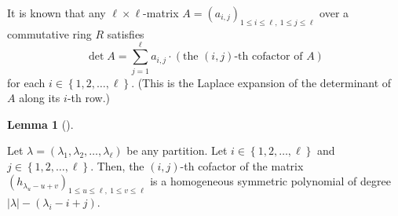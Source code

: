 \documentclass[numbers=enddot,12pt,final,onecolumn,notitlepage]{scrartcl}%
\theoremstyle{definition}
\newtheorem{lem}[theo]{Lemma}
\newenvironment{lemma}[1][]
{\begin{lem}[#1]\begin{leftbar}}
{\end{leftbar}\end{lem}}
\let\sumnonlimits\sum
\renewcommand{\sum}{\sumnonlimits\limits}
\begin{document}
It is known that any $\ell\times\ell$-matrix $A=\left(  a_{i,j}\right)
_{1\leq i\leq\ell,\ 1\leq j\leq\ell}$ over a commutative ring $R$ satisfies%
\begin{equation}
\det A=\sum_{j=1}^{\ell}a_{i,j}\cdot\left(  \text{the }\left(  i,j\right)
\text{-th cofactor of }A\right)  \label{eq.det.lap-exp}%
\end{equation}
for each $i\in\left\{  1,2,\ldots,\ell\right\}  $. (This is the Laplace
expansion of the determinant of $A$ along its $i$-th row.)

\begin{lemma}
\label{lem.I.cofactor1}Let $\lambda=\left(  \lambda_{1},\lambda_{2}%
,\ldots,\lambda_{\ell}\right)  $ be any partition. Let $i\in\left\{
1,2,\ldots,\ell\right\}  $ and $j\in\left\{  1,2,\ldots,\ell\right\}  $. Then,
the $\left(  i,j\right)  $-th cofactor of the matrix $\left(  h_{\lambda
_{u}-u+v}\right)  _{1\leq u\leq\ell,\ 1\leq v\leq\ell}$ is a homogeneous
symmetric polynomial of degree $\left\vert \lambda\right\vert -\left(
\lambda_{i}-i+j\right)  $.
\end{lemma}
\end{document}
